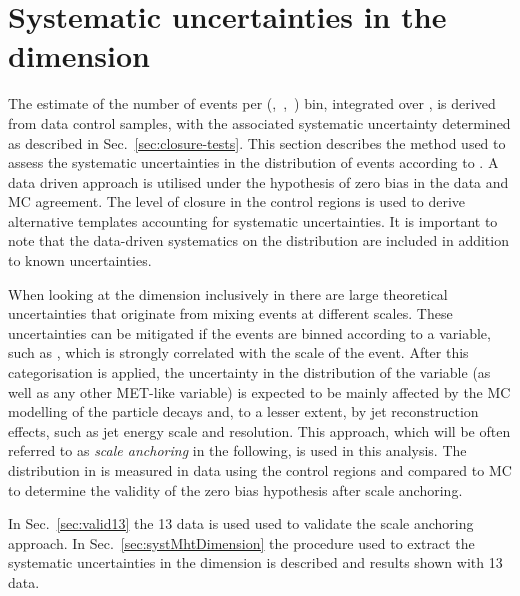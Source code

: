 \section{Systematic uncertainties in the \mht dimension}
\label{sec:syst-on-shape}

The estimate of the number of events per (\njet,~\nb,~\scalht) bin,
integrated over \mht, is derived from data control samples, with
the associated systematic uncertainty determined as 
described in Sec.~\ref{sec:closure-tests}. This section
describes the method used to assess the systematic uncertainties in
the distribution of events according to \mht. A data driven approach is
utilised under the hypothesis of zero bias in the data and MC agreement.
The level of closure in the control regions is used
to derive alternative templates accounting for systematic uncertainties.
It is important to note that the data-driven systematics on the 
\mht distribution are included in addition to known uncertainties.

When looking at the \mht dimension inclusively in \scalht there are
large theoretical uncertainties that originate from mixing events
at different scales. These uncertainties can be mitigated if the events 
are binned according to a variable, such as \scalht, 
which is strongly correlated with the scale of the event. 
After this categorisation is applied, the uncertainty in 
the distribution of the \mht variable
(as well as any other MET-like variable) is expected to be 
mainly affected by the MC modelling of the particle 
decays and, to a lesser extent, by jet reconstruction effects, 
such as jet energy scale and resolution. 
This approach, which will be often referred to as \textit{scale anchoring}
in the following, is used in this analysis. The distribution in \mht
is measured in data using the control regions and compared to MC
to determine the validity of the zero bias hypothesis after scale anchoring.

In Sec.~\ref{sec:valid13} the 13 \TeV data is used used 
to validate the scale anchoring approach. 
In Sec.~\ref{sec:systMhtDimension} 
the procedure used to extract the systematic uncertainties in the 
\mht dimension is described and results shown with 13 \TeV data. 


